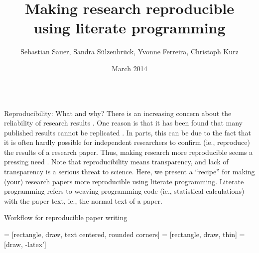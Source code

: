 \documentclass[final,hyperref={pdfpagelabels=false}]{beamer}
\title{Making research reproducible \\using literate programming}
\author{Sebastian Sauer, Sandra S\"ulzenbr\"uck, Yvonne Ferreira,  Christoph Kurz}
\institute{FOM University of Applied Sciences, Helmholtz Zentrum M\"unchen}
\date{March 2014}
\begin{document}
  \begin{frame}{} 
    
      \begin{columns}[t]
      
      \begin{column}{.48\linewidth}
      
        \begin{block}{Reproducibility: What and why?}
      There is an increasing concern about the reliability of research results \cite{Peng2015}. One reason is that
    it has been found that many published results cannot be replicated \cite{OpenScienceCollaboration2015}.
    In parts, this can be due to the fact that it is often hardly possible for independent researchers to
    confirm (ie., reproduce) the results of a research paper. Thus, making research more reproducible seems a pressing need  \cite{Peng2015}. Note that reproducibility means transparency, and lack of transparency is a serious threat to science.
    Here, we present a ``recipe'' for making (your) research papers more reproducible using literate programming.
    Literate programming refers to weaving programming code (ie., statistical calculations) with the paper text, ie., the normal text of a paper.    
    
    \end{block}
      
      
      
            \begin{block}{Workflow for reproducible paper writing}
         
      \begin{minipage}[t]{0.45\textwidth}
       = [rectangle, draw, text centered, rounded corners]
       = [rectangle, draw, thin]
       = [draw, -latex']
      \begin{tikzpicture}[node distance=7cm, auto]
        

\end{tikzpicture}
\end{minipage}
\end{block}
\end{column}
\end{columns}
\end{frame}
\end{document}
